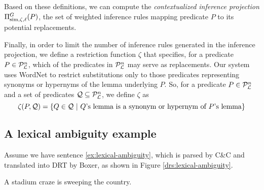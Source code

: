 Based on these definitions, we can compute the \textit{contextualized
inference projection} $\Pi^G_{\mathrm{sim},\zeta,\ell}(P)$, the set of weighted
inference rules mapping predicate $P$ to its potential replacements.

Finally, in order to limit the number of inference rules generated in the
inference projection, we define a restriction function $\zeta$ that specifies,
for a predicate $P \in {\cal{P}}_{{\cal{L}}}^n$, which of the predicates in
${\cal{P}}_{{\cal{L}}}^n$ may serve as replacements.  Our system uses WordNet
\citep{miller:wordnet2009} to restrict substitutions only to those predicates
representing synonyms or hypernyms of the lemma underlying $P$.  So, for a
predicate $P \in {\cal{P}}_{{\cal{L}}}^n$ and a set of predicates ${\cal Q}
\subseteq {\cal{P}}_{{\cal{L}}}^n$, we define $\zeta$ as \[ \zeta(P,{\cal Q}) = \{
Q \in {\cal Q} ~|~ Q\text{'s lemma is a synonym or hypernym of }P\text{'s lemma}
\} \]


\subsection*{A lexical ambiguity example}

Assume we have sentence \eqref{ex:lexical-ambiguity}, which is parsed by C\&C
and translated into DRT by Boxer, as shown in Figure
\ref{drs:lexical-ambiguity}.

\begin{covex}\label{ex:lexical-ambiguity}
  A stadium craze is sweeping the country.
\end{covex}

